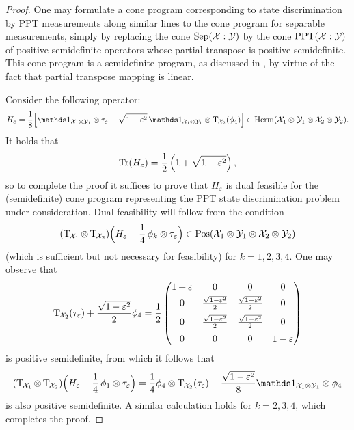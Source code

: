 \begin{proof}
  One may formulate a cone program corresponding to state discrimination by 
  PPT measurements along similar lines to the cone program for separable
  measurements, simply by replacing the cone $\mathrm{Sep}(\mathcal{X}:\mathcal{Y})$ by the cone
  $\mathrm{PPT}(\mathcal{X}:\mathcal{Y})$ of positive semidefinite operators whose partial transpose is
  positive semidefinite.
  This cone program is a semidefinite program, as discussed in
  \cite{Cosentino13}, by virtue of the fact that partial transpose mapping is
  linear.
  
  Consider the following operator:
  \begin{equation}
    H_{\varepsilon} = \frac{1}{8}
    \Bigl[
      \I_{\X_1 \otimes \Y_1} \otimes \tau_{\varepsilon}
      + \sqrt{1 - \varepsilon^2}\,
      \I_{\X_1 \otimes \Y_1} \otimes \pt_{\negsmallspace\X_2}(\phi_4)
      \Bigr] \in \Herm(\X_1\otimes\Y_1\otimes\X_2\otimes\Y_2).
  \end{equation}
  It holds that
  \begin{equation}
    \operatorname{Tr}(H_{\varepsilon}) = \frac{1}{2}\left( 1 + \sqrt{1-\varepsilon^2} \right),
  \end{equation}
  so to complete the proof it suffices to prove that $H_{\varepsilon}$ is
  dual feasible for the (semidefinite) cone program representing the 
  PPT state discrimination problem under consideration.
  Dual feasibility will follow from the condition
  \begin{equation}
    (\operatorname{T}_{\mspace{-1.5mu}\mathcal{X}_1} \otimes \operatorname{T}_{\mspace{-1.5mu}\mathcal{X}_2})
    \Bigl(
    H_{\varepsilon} - \frac{1}{4}\,\phi_k\otimes\tau_{\varepsilon}\Bigr)
    \in\mathrm{Pos}(\mathcal{X}_1\otimes\mathcal{Y}_1\otimes\mathcal{X}_2\otimes\mathcal{Y}_2)
  \end{equation}
  (which is sufficient but not necessary for feasibility) for $k = 1,2,3,4$.
  One may observe that
  \begin{equation}
    \operatorname{T}_{\mspace{-1.5mu}\mathcal{X}_2}(\tau_{\varepsilon}) 
    + \frac{\sqrt{1-\varepsilon^2}}{2}\phi_4
    = \frac{1}{2}
    \begin{pmatrix}
      1 + \varepsilon & 0 & 0 & 0\\[1mm]
      0 & \frac{\sqrt{1 - \varepsilon^2}}{2} 
      & \frac{\sqrt{1 - \varepsilon^2}}{2} & 0\\[2mm]
      0 & \frac{\sqrt{1 - \varepsilon^2}}{2} 
      & \frac{\sqrt{1 - \varepsilon^2}}{2} & 0\\[2mm]
      0 & 0 & 0 & 1 - \varepsilon
    \end{pmatrix}
  \end{equation}
  is positive semidefinite, from which it follows that
  \begin{equation}
    (\pt_{\negsmallspace\X_1} \otimes \pt_{\negsmallspace\X_2})
    \Bigl(
    H_{\varepsilon} - \frac{1}{4}\,\phi_1\otimes\tau_{\varepsilon}\Bigr)
    = \frac{1}{4} \phi_4 \otimes \pt_{\negsmallspace\X_2}(\tau_{\varepsilon})
    + \frac{\sqrt{1 - \varepsilon^2}}{8} \I_{\X_1\otimes\Y_1} \otimes \phi_4
  \end{equation}
  is also positive semidefinite.
  A similar calculation holds for $k=2,3,4$, which completes the proof.
\end{proof}

